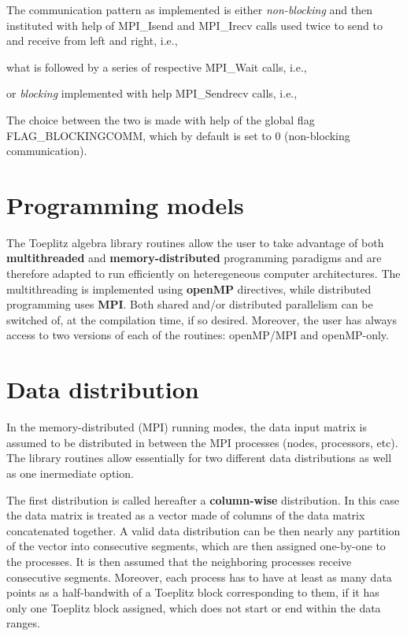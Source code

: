 The communication pattern as implemented is either {\itshape non-\/blocking} and then instituted with help of {\ttfamily M\-P\-I\-\_\-\-Isend} and {\ttfamily M\-P\-I\-\_\-\-Irecv} calls used twice to send to and receive from left and right, i.\-e.,


\begin{DoxyCodeInclude}
\end{DoxyCodeInclude}
 what is followed by a series of respective {\ttfamily M\-P\-I\-\_\-\-Wait} calls, i.\-e.,


\begin{DoxyCodeInclude}
\end{DoxyCodeInclude}
 or {\itshape blocking} implemented with help {\ttfamily M\-P\-I\-\_\-\-Sendrecv} calls, i.\-e.,


\begin{DoxyCodeInclude}
\end{DoxyCodeInclude}
 The choice between the two is made with help of the global flag {\ttfamily F\-L\-A\-G\-\_\-\-B\-L\-O\-C\-K\-I\-N\-G\-C\-O\-M\-M}, which by default is set to 0 (non-\/blocking communication). \section{Programming models}\label{toeplitz_progmodels}
The Toeplitz algebra library routines allow the user to take advantage of both {\bfseries multithreaded} and {\bfseries memory-\/distributed} programming paradigms and are therefore adapted to run efficiently on heteregeneous computer architectures. The multithreading is implemented using {\bfseries open\-M\-P} directives, while distributed programming uses {\bfseries M\-P\-I}. Both shared and/or distributed parallelism can be switched of, at the compilation time, if so desired. Moreover, the user has always access to two versions of each of the routines\-: open\-M\-P/\-M\-P\-I and open\-M\-P-\/only. \section{Data distribution}\label{toeplitz_datadistr}
In the memory-\/distributed (M\-P\-I) running modes, the data input matrix is assumed to be distributed in between the M\-P\-I processes (nodes, processors, etc). The library routines allow essentially for two different data distributions as well as one inermediate option.



The first distribution is called hereafter a {\bfseries column-\/wise} distribution. In this case the data matrix is treated as a vector made of columns of the data matrix concatenated together. A valid data distribution can be then nearly any partition of the vector into consecutive segments, which are then assigned one-\/by-\/one to the processes. It is then assumed that the neighboring processes receive consecutive segments. Moreover, each process has to have at least as many data points as a half-\/bandwith of a Toeplitz block corresponding to them, if it has only one Toeplitz block assigned, which does not start or end within the data ranges.


